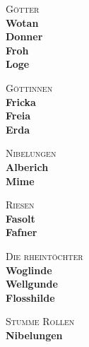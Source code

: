 \documentclass[10.5pt,openany]{book}
\begin{document}
\begin{center}
{\small\color{stage}\textsc{Götter}}\\[0.8ex]
\textbf{Wotan}\\[0.3ex]
\textbf{Donner}\\[0.3ex]
\textbf{Froh}\\[0.3ex]
\textbf{Loge}\\[0.3ex]
\par\vspace{1.0ex}
{\small\color{stage}\textsc{Göttinnen}}\\[0.8ex]
\textbf{Fricka}\\[0.3ex]
\textbf{Freia}\\[0.3ex]
\textbf{Erda}\\[0.3ex]
\par\vspace{1.0ex}
{\small\color{stage}\textsc{Nibelungen}}\\[0.8ex]
\textbf{Alberich}\\[0.3ex]
\textbf{Mime}\\[0.3ex]
\par\vspace{1.0ex}
{\small\color{stage}\textsc{Riesen}}\\[0.8ex]
\textbf{Fasolt}\\[0.3ex]
\textbf{Fafner}\\[0.3ex]
\par\vspace{1.0ex}
{\small\color{stage}\textsc{Die rheintöchter}}\\[0.8ex]
\textbf{Woglinde}\\[0.3ex]
\textbf{Wellgunde}\\[0.3ex]
\textbf{Flosshilde}\\[0.3ex]
\par\vspace{1.0ex}
{\small\color{stage}\textsc{Stumme Rollen}}\\[0.8ex]
\textbf{Nibelungen}\\[0.3ex]
\par\vspace{1.0ex}
\end{center}
\end{document}
